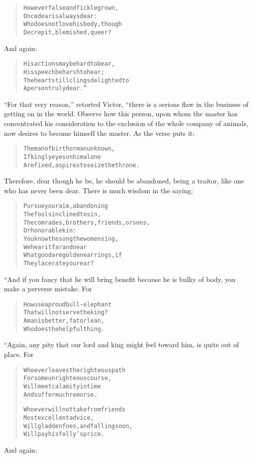 \documentclass[article, twoside, 10pt]{memoir}
\renewenvironment{verbatim}{%
\begin{quote}%
\vskip -10pt%
\begin{alltt}\normalfont\small}{\end{alltt}%
\end{quote}%
\vskip -10pt
} %
\begin{document}
\begin{verbatim}
However false and fickle grown,
    Once dear is always dear:
Who does not love his body, though
    Decrepit, blemished, queer?
\end{verbatim}
And again:

\begin{verbatim}
His actions may be hard to bear,
    His speech be harsh to hear;
The heart still clings delighted to
    A person truly dear.”
\end{verbatim}
``For that very reason,'' retorted Victor, “there is a serious flaw
in the business of getting on in the world. Observe how this
person, upon whom the master has concentrated his consideration to
the exclusion of the whole company of animals, now desires to
become himself the master. As the verse puts it:

\begin{verbatim}
The man of birth or man unknown,
If kingly eyes on him alone
Are fixed, aspires to seize the throne.
\end{verbatim}
Therefore, dear though he be, he should be abandoned, being a
traitor, like one who has never been dear. There is much wisdom in
the saying:

\begin{verbatim}
Pursue your aim, abandoning
    The fools inclined to sin,
The comrades, brothers, friends, or sons,
    Or honorable kin:
You know the song the women sing,
    We hear it far and near{\textemdash}
What good are golden earrings, if
    They lacerate your ear?
\end{verbatim}
“And if you fancy that he will bring benefit because he is bulky of
body, you make a perverse mistake. For

\begin{verbatim}
How use a proud bull-elephant
    That will not serve the king?
A man is better, fat or lean,
    Who does the helpful thing.
\end{verbatim}
“Again, any pity that our lord and king might feel toward him, is
quite out of place. For

\begin{verbatim}
Whoever leaves the righteous path
    For some unrighteous course,
Will meet calamity in time
    And suffer much remorse.

Whoever will not take from friends
    Most excellent advice,
Will gladden foes, and falling soon,
    Will pay his folly's price.
\end{verbatim}
And again:
\end{document}
